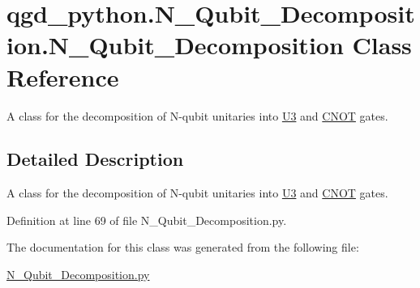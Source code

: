 \hypertarget{classqgd__python_1_1_n___qubit___decomposition_1_1_n___qubit___decomposition}{}\section{qgd\+\_\+python.\+N\+\_\+\+Qubit\+\_\+\+Decomposition.\+N\+\_\+\+Qubit\+\_\+\+Decomposition Class Reference}
\label{classqgd__python_1_1_n___qubit___decomposition_1_1_n___qubit___decomposition}


A class for the decomposition of N-\/qubit unitaries into \hyperlink{class_u3}{U3} and \hyperlink{class_c_n_o_t}{C\+N\+OT} gates.  




\subsection{Detailed Description}
A class for the decomposition of N-\/qubit unitaries into \hyperlink{class_u3}{U3} and \hyperlink{class_c_n_o_t}{C\+N\+OT} gates. 



Definition at line 69 of file N\+\_\+\+Qubit\+\_\+\+Decomposition.\+py.



The documentation for this class was generated from the following file\+:\begin{DoxyCompactItemize}
\item 
\hyperlink{_n___qubit___decomposition_8py}{N\+\_\+\+Qubit\+\_\+\+Decomposition.\+py}\end{DoxyCompactItemize}
